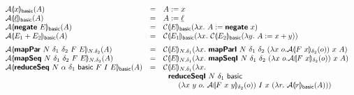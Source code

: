 \begin{figure}
  \begin{displaymath}
    \begin{array}{lcl}
      \semA{x}_\basic(A)
      &=& A := x
      \\
      \semA{\underline{\ell}}_{\basic}(A)
      &=& A := \underline{\ell}
      \\
      \semA{\prim{negate}~E}_{\basic}(A)
      &=& \semE{E}_{\basic}(\lambda x.~A := \prim{negate}~x)
      \\
      \semA{E_1 + E_2}_{\basic}(A)
      &=& \semE{E_1}_{\basic}(\lambda x.~\semE{E_2}_{\basic}(\lambda y.~A := x + y))
      \medskip\\

      \semA{\prim{mapPar}~N~\delta_1~\delta_2~F~E}_{N.\delta_2}(A)
      &=& \semE{E}_{N.\delta_1}(\lambda x.~\prim{mapParI}~N~\delta_1~\delta_2~(\lambda x~o. \semA{F~x}_{\delta_2}(o))~x~A)
      \\
      \semA{\prim{mapSeq}~N~\delta_1~\delta_2~F~E}_{N.\delta_2}(A)
      &=& \semE{E}_{N.\delta_1}(\lambda x.~\prim{mapSeqI}~N~\delta_1~\delta_2~(\lambda x~o. \semA{F~x}_{\delta_2}(o))~x~A)
      \\
      \semA{\prim{reduceSeq}~N~\alpha~\delta_1~\basic~F~I~E}_{\mathsf{\basic}}(A)
      &=& \begin{array}[t]{@{}l}
          \semE{E}_{N.\delta_1}(\lambda x.\\
          ~~\prim{reduceSeqI}~N~\delta_1~\basic\\
          \qquad (\lambda x~y~o.~\semA{F~x~y}_{\delta_2}(o))~I~x~(\lambda r.~\semA{r}_{\basic}(A)))
          \end{array}
      \medskip\\


\end{array}
\end{displaymath}
\end{figure}
